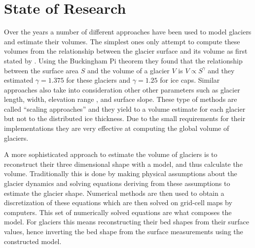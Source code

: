 \section{State of Research}\label{research}
Over the years a number of different approaches have been used to model glaciers and estimate their volumes.
The simplest ones only attempt to compute these volumes from the relationship between the glacier surface and its volume as first stated by \citet{bahr1997}. Using the Buckingham Pi
theorem they found that the relationship between the surface area $S$ and the volume of a glacier $V$ is $V \propto S^{\gamma}$ and they estimated $\gamma=1.375$ for these glaciers and $\gamma=1.25$ for ice caps. Similar approaches also take into consideration other other parameters such as glacier length, width, elevation range \citep{Grinsted2013}, and surface slope. These type of methods are called ``scaling approaches'' and they yield to a volume estimate for each glacier but not to the distributed ice thickness. Due to the small requirements for their implementations they are very effective at computing the global volume of glaciers.

A more sophisticated approach to estimate the volume of glaciers is to reconstruct their three dimensional shape with a model, and thus calculate the volume. Traditionally this is done by making physical assumptions about the glacier dynamics and solving equations deriving from these assumptions to estimate the glacier shape. Numerical methods are then used to obtain a discretization of these equations which are then solved on grid-cell maps by computers. This set of numerically solved equations are what composes the model. 
For glaciers this means reconstructing their bed shapes from their surface values, hence inverting the bed shape from the surface measurements using the constructed model.
 

